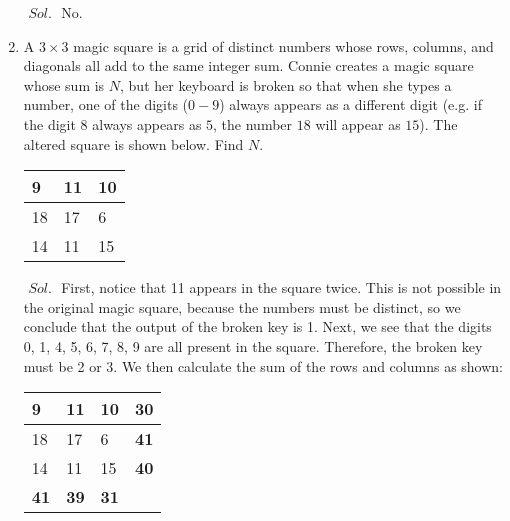 \documentclass[a4paper]{article}
\theoremstyle{definition}
\begin{document}
\begin{enumerate}
\begin{tcolorbox}[width=\linewidth, sharp corners=all, colback=white!95!black]

$\textit{ Sol. }$
No.
\end{tcolorbox}

\item A $3  \times 3$ magic square is a grid of distinct numbers whose rows, columns, and diagonals
all add to the same integer sum. Connie creates a magic square whose sum is $N$, but her
keyboard is broken so that when she types a number, one of the digits ($0 - 9$) always appears
as a different digit (e.g. if the digit $8$ always appears as $5$, the number $18$ will appear as $15$).
The altered square is shown below. Find $N$.

\begin{table}[h]
    \begin{center}

\begin{tabular}{|l|l|l|}
\hline
9  & 11 & 10 \\ \hline
18 & 17 & 6  \\ \hline
14 & 11 & 15 \\ \hline
\end{tabular}
\end{center}
\end{table}

\begin{tcolorbox}[width=\linewidth, sharp corners=all, colback=white!95!black]

$\textit{ Sol. }$
First, notice that 11 appears in the square twice. This is not possible in the
original magic square, because the numbers must be distinct, so we conclude that the output
of the broken key is 1.
Next, we see that the digits 0, 1, 4, 5, 6, 7, 8, 9 are all present in the square. Therefore, the
broken key must be 2 or 3. We then calculate the sum of the rows and columns as shown:
\end{tcolorbox}
\begin{table}[h]
    \begin{center}

\begin{tabular}{|l|l|l|l}
\hline
9  & 11 & 10  & \textbf{30}\\ \hline
18 & 17 & 6  & \textbf{41}\\ \hline
14 & 11 & 15 & \textbf{40}\\ \hline
\textbf{41} & \textbf{39} & \textbf{31}
\end{tabular}
\end{center}
\end{table}



\end{enumerate}
\end{document}
